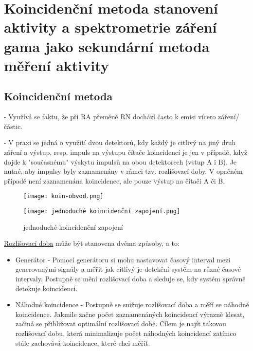 \newpage
\section{Koincidenční metoda stanovení aktivity a spektrometrie záření gama jako sekundární metoda měření aktivity}

\subsection{Koincidenční metoda}


- Využívá se faktu, že při RA přeměně RN dochází často k emisi vícero záření/částic.

- V praxi se jedná o využití dvou detektorů, kdy každý je citlivý na jiný druh záření a výstup, resp. impuls na výstupu čítače koincidencí je jen v případě, když dojde k "současnému" výskytu impulsů na obou detektorech (vstup A i B). Je nutné, aby impulsy byly zaznamenány v rámci tzv. rozlišovací doby. V opačném případě není zaznamenána koincidence, ale pouze výstup na čítači A či B.

\begin{figure}[ht!]
\centering

\texttt{[image: koin-obvod.png]}
\end{figure}

\begin{figure}[ht!]
    \centering
    \texttt{[image: jednoduché koincidenční zapojení.png]}
    \caption{jednoduché koincidenční zapojení}
\end{figure}

\underline{Rozlišovací doba} může být stanovena dvěma způsoby, a to:
\begin{itemize}
    \item Generátor - Pomocí generátoru si mohu nastavovat časový interval mezi generovanými signály a měřit jak citlivý je detekční systém na různé časové intervaly. Postupně se mění rozlišovací doba a sleduje se, kdy systém správně detekuje koincidenci.
    \item Náhodné koincidence - Postupně se snižuje rozlišovací doba a měří se náhodné koincidence. Jakmile začne počet zaznamenáných koincidencí výrazně klesat, začiná se přibližovat optimální rozlišovací době. Cílem je najít takovou rozlišovací dobu, která minimalizuje počet náhodných koincidencí zatímco stále zachovává koincidence, které chci měřit.
\end{itemize}

